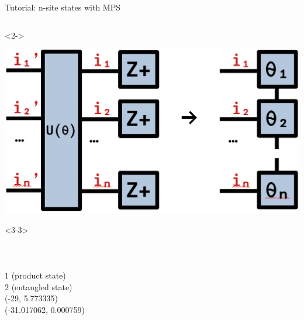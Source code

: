 \begin{frame}[fragile]{Tutorial: n-site states with MPS}
\begin{columns}
\begin{column}{4.5cm}
\begin{onlyenv}<2->
\vspace*{0.0cm}
\begin{center}
\includegraphics[width=\textwidth]{
  slides/assets/U_Zpn.png
}
\end{center}
\vspace*{0.0cm}
\end{onlyenv}

\begin{onlyenv}<3-3>
~\\
~\\
~\\
~\\
1 (product state) \\
2 (entangled state) \\
(-29, 5.773335) \\
(-31.017062, 0.000759)
\end{onlyenv}


\end{column}
\end{columns}
\end{frame}

